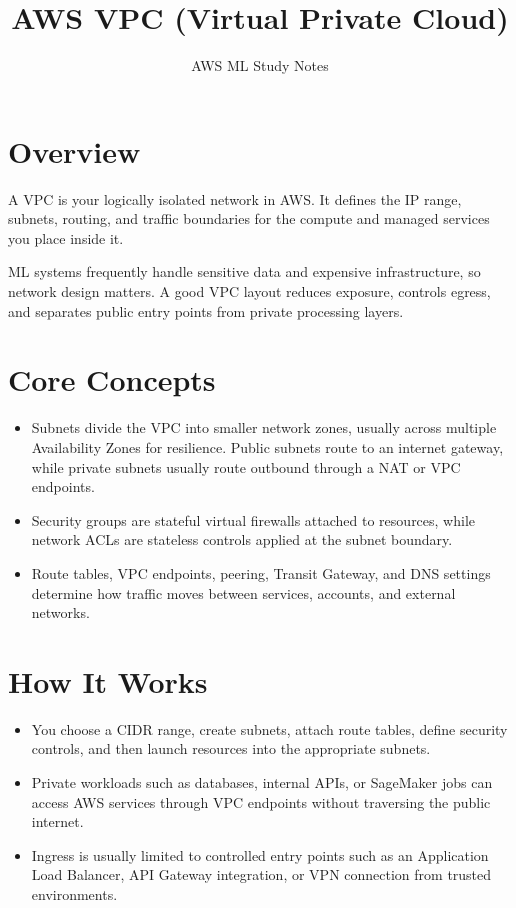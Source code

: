 \documentclass[10pt,twocolumn]{article}
\begin{document}
\title{\vspace{-1.6cm}AWS VPC (Virtual Private Cloud)}
\author{AWS ML Study Notes}
\date{}
\maketitle
\small

\section*{Overview}
A VPC is your logically isolated network in AWS. It defines the IP range, subnets, routing, and traffic boundaries for the compute and managed services you place inside it.

ML systems frequently handle sensitive data and expensive infrastructure, so network design matters. A good VPC layout reduces exposure, controls egress, and separates public entry points from private processing layers.

\section*{Core Concepts}
\begin{itemize}
\item Subnets divide the VPC into smaller network zones, usually across multiple Availability Zones for resilience. Public subnets route to an internet gateway, while private subnets usually route outbound through a NAT or VPC endpoints.
\item Security groups are stateful virtual firewalls attached to resources, while network ACLs are stateless controls applied at the subnet boundary.
\item Route tables, VPC endpoints, peering, Transit Gateway, and DNS settings determine how traffic moves between services, accounts, and external networks.
\end{itemize}

\section*{How It Works}
\begin{itemize}
\item You choose a CIDR range, create subnets, attach route tables, define security controls, and then launch resources into the appropriate subnets.
\item Private workloads such as databases, internal APIs, or SageMaker jobs can access AWS services through VPC endpoints without traversing the public internet.
\item Ingress is usually limited to controlled entry points such as an Application Load Balancer, API Gateway integration, or VPN connection from trusted environments.
\end{itemize}
\end{document}
